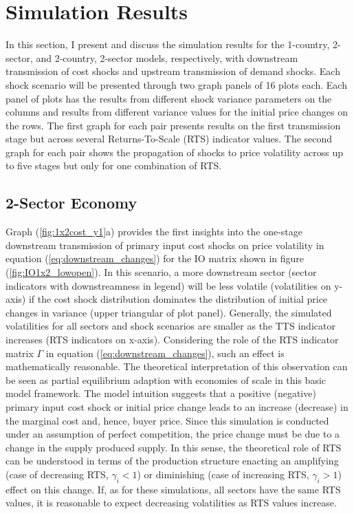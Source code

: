 \section{Simulation Results}
\label{sec:simres}

In this section, I present and discuss the simulation results for the 1-country, 2-sector, and 2-country, 2-sector models, 
respectively, with downstream transmission of cost shocks and upstream transmission of demand shocks. Each shock scenario will be 
presented through two graph panels of 16 plots each. Each panel of plots has the results from different shock variance parameters on 
the columns and results from different variance values for the initial price changes on the rows. The first graph for each pair 
presents results on the first transmission stage but across several Returns-To-Scale (RTS) indicator values. The second graph for each 
pair shows the propagation of shocks to price volatility across up to five stages but only for one combination of RTS.

\subsection{2-Sector Economy}

Graph (\ref{fig:1x2cost_y1}a) provides the first insights into the one-stage downstream transmission of primary input cost shocks on 
price volatility in equation (\ref{eq:downstream_changes}) for the IO matrix shown in figure (\ref{fig:IO1x2_lowopen}). In this scenario, a more 
downstream sector (sector indicators with downstreamness in legend) will be less volatile (volatilities on y-axis) if the cost shock 
distribution dominates the distribution of initial price changes in variance (upper triangular of plot panel). Generally, the simulated 
volatilities for all sectors and shock scenarios are smaller as the TTS indicator increases (RTS indicators on x-axis). Considering the 
role of the RTS indicator matrix $\Gamma$ in equation (\ref{eq:downstream_changes}), such an effect is mathematically reasonable. 
The theoretical interpretation of this observation can be seen as partial equilibrium adaption with economies of scale in this basic 
model framework. The model intuition suggests that a positive (negative) primary input cost shock or initial price change leads to an 
increase (decrease) in the marginal cost and, hence, buyer price. Since this simulation is conducted under an assumption of perfect 
competition, the price change must be due to a change in the supply produced supply. In this sense, the theoretical role of RTS can 
be understood in terms of the production structure enacting an amplifying (case of decreasing RTS, $\gamma_i < 1$) or diminishing 
(case of increasing RTS, $\gamma_i > 1$) effect on this change. If, as for these simulations, all sectors have the same RTS values, 
it is reasonable to expect decreasing volatilities as RTS values increase. 

